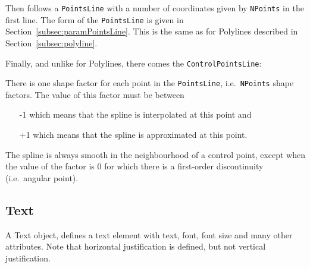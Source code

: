 \documentclass[10pt, a4paper]{article}
\begin{document}
Then follows a \texttt{PointsLine} with a number of coordinates 
given by \texttt{NPoints} in the first line. 
The form of the \texttt{PointsLine} is given 
in Section~\ref{subsec:paramPointsLine}. 
This is the same as for Polylines described in Section~\ref{subsec:polyline}. 

Finally, and unlike for Polylines, there comes the \texttt{ControlPointsLine}: 

There is one shape factor for each point in the \texttt{PointsLine}, 
i.e.~\texttt{NPoints} shape factors. 
The value of this factor must be between 
%
\begin{itemize}
\item[-1] which means that the spline is interpolated at this point  and 
\item[+1] which means that the spline is approximated at this point. 
\end{itemize}
%
The spline is always smooth in the neighbourhood of a control point, 
except when the value of the factor is 0 
for which there is a first-order discontinuity (i.e.~angular point).


\subsection{Text}\label{subsec:text}

A Text object, defines a text element 
with text, font, font size and many other attributes. 
Note that horizontal justification is defined, 
but not vertical justification. 
\end{document}
